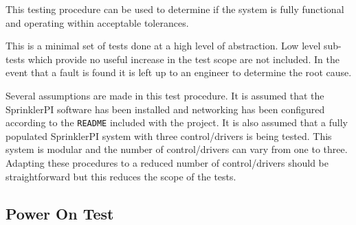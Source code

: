 \documentclass{article}
\begin{document}
This testing procedure can be used to determine if the system
is fully functional and operating within acceptable tolerances.

This is a minimal set of tests done at a high level of abstraction.
Low level sub-tests which provide no useful increase in the test scope
are not included.
In the event that a fault is found it is left up to an engineer to
determine the root cause.

Several assumptions are made in this test procedure.
It is assumed that the SprinklerPI software has been installed
and networking has been configured according to the \verb+README+
included with the project\autocite{sprinklerpi}.
It is also assumed that a fully populated SprinklerPI system with
three control/drivers is being tested.
This system is modular and the number of control/drivers can vary
from one to three.
Adapting these procedures to a reduced number of control/drivers should
be straightforward but this reduces the scope of the tests.

\subsection{Power On Test}
\end{document}
